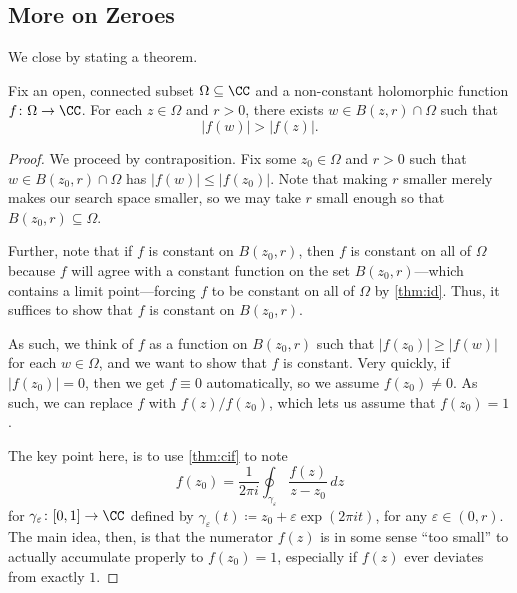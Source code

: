 \documentclass[../notes.tex]{subfiles}
\begin{document}
\subsection{More on Zeroes}
We close by stating a theorem.
\begin{theorem} \label{thm:mmp}
	Fix an open, connected subset $\Omega\subseteq\CC$ and a non-constant holomorphic function $f\colon\Omega \to\CC$. For each $z\in\Omega$ and $r>0$, there exists $w\in B(z,r)\cap\Omega$ such that
	\[|f(w)|>|f(z)|.\]
\end{theorem}
\begin{proof}
	We proceed by contraposition. Fix some $z_0\in\Omega$ and $r>0$ such that $w\in B(z_0,r)\cap\Omega$ has $|f(w)|\le|f(z_0)|$. Note that making $r$ smaller merely makes our search space smaller, so we may take $r$ small enough so that $B(z_0,r)\subseteq\Omega$.
	
	Further, note that if $f$ is constant on $B(z_0,r)$, then $f$ is constant on all of $\Omega$ because $f$ will agree with a constant function on the set $B(z_0,r)$---which contains a limit point---forcing $f$ to be constant on all of $\Omega$ by \autoref{thm:id}. Thus, it suffices to show that $f$ is constant on $B(z_0,r)$.

	As such, we think of $f$ as a function on $B(z_0,r)$ such that $|f(z_0)|\ge|f(w)|$ for each $w\in\Omega$, and we want to show that $f$ is constant. Very quickly, if $|f(z_0)|=0$, then we get $f\equiv0$ automatically, so we assume $f(z_0)\ne0$. As such, we can replace $f$ with $f(z)/f(z_0)$, which lets us assume that $f(z_0)=1$.
	
	The key point here, is to use \autoref{thm:cif} to note
	\[f(z_0)=\frac1{2\pi i}\oint_{\gamma_\varepsilon}\frac{f(z)}{z-z_0}\,dz\]
	for $\gamma_\varepsilon\colon [0,1]\to\CC$ defined by $\gamma_\varepsilon(t)\coloneqq z_0+\varepsilon\exp(2\pi it)$, for any $\varepsilon\in(0,r)$. The main idea, then, is that the numerator $f(z)$ is in some sense ``too small'' to actually accumulate properly to $f(z_0)=1$, especially if $f(z)$ ever deviates from exactly $1$.
	

\end{proof}
\end{document}
